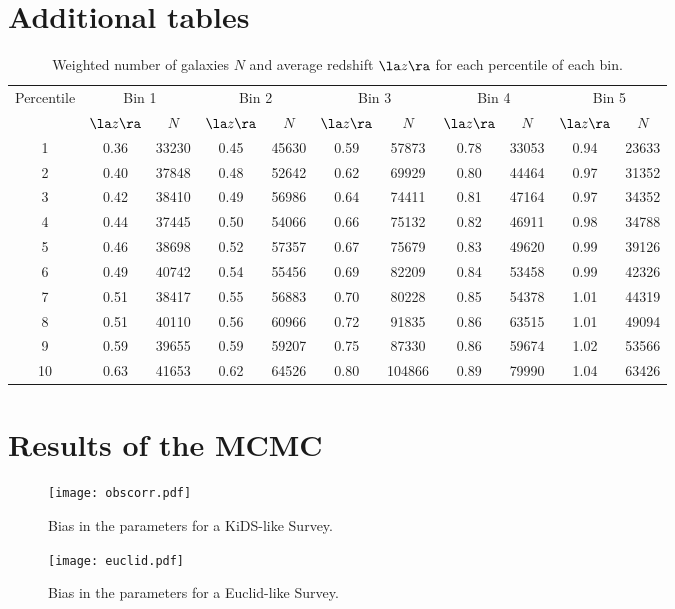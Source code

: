 \section{Additional tables}
\begin{table}[h]
\centering
\caption{Weighted number of galaxies $N$ and average redshift $\la z \ra$ for each percentile of each bin.}
\hspace*{0.5cm}
\begin{tabular}{c|cc|cc|cc|cc|cc}
Percentile & \multicolumn{2}{c|}{Bin 1} & \multicolumn{2}{c|}{Bin 2} & \multicolumn{2}{c|}{Bin 3}& \multicolumn{2}{c|}{Bin 4}& \multicolumn{2}{c}{Bin 5} \\
 & $\la z \ra$ & $N$ & $\la z \ra$ & $N$& $\la z \ra$ & $N$& $\la z \ra$ & $N$& $\la z \ra$ & $N$ \\
\toprule
 1 & 0.36 &  33230 & 0.45 &  45630 & 0.59 &  57873 & 0.78 &  33053 & 0.94 &  23633 \\
 2 & 0.40 &  37848 & 0.48 &  52642 & 0.62 &  69929 & 0.80 &  44464 & 0.97 &  31352 \\
 3 & 0.42 &  38410 & 0.49 &  56986 & 0.64 &  74411 & 0.81 &  47164 & 0.97 &  34352 \\
 4 & 0.44 &  37445 & 0.50 &  54066 & 0.66 &  75132 & 0.82 &  46911 & 0.98 &  34788 \\
 5 & 0.46 &  38698 & 0.52 &  57357 & 0.67 &  75679 & 0.83 &  49620 & 0.99 &  39126 \\
 6 & 0.49 &  40742 & 0.54 &  55456 & 0.69 &  82209 & 0.84 &  53458 & 0.99 &  42326 \\
 7 & 0.51 &  38417 & 0.55 &  56883 & 0.70 &  80228 & 0.85 &  54378 & 1.01 &  44319 \\
 8 & 0.51 &  40110 & 0.56 &  60966 & 0.72 &  91835 & 0.86 &  63515 & 1.01 &  49094 \\
 9 & 0.59 &  39655 & 0.59 &  59207 & 0.75 &  87330 & 0.86 &  59674 & 1.02 &  53566 \\
10 & 0.63 &  41653 & 0.62 &  64526 & 0.80 & 104866 & 0.89 &  79990 & 1.04 &  63426 \\
\bottomrule
\end{tabular}
\label{tab:nvsz}
\end{table}

\clearpage
\section{Results of the MCMC}
\begin{figure}[h]
\centering
	\texttt{[image: obscorr.pdf]}
	\caption{Bias in the parameters for a KiDS-like Survey.}
	\label{fig:mcmc_kids}
\end{figure}  
\begin{figure}[h]
\centering
	\texttt{[image: euclid.pdf]}
	\caption{Bias in the parameters for a Euclid-like Survey.}
	\label{fig:mcmc_euclid}
\end{figure}  
\clearpage
